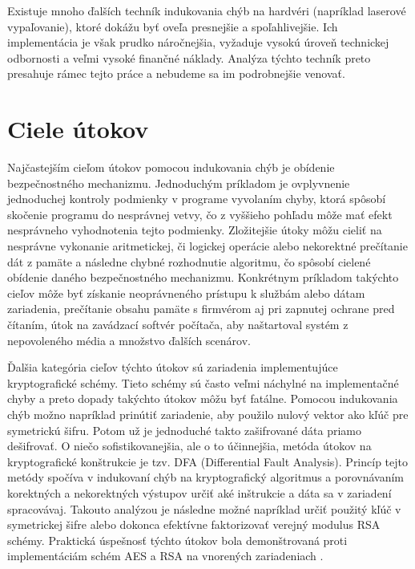 Existuje mnoho ďalších techník indukovania chýb na hardvéri (napríklad laserové vypaľovanie), ktoré dokážu byť oveľa presnejšie a spoľahlivejšie. Ich implementácia je však prudko náročnejšia, vyžaduje vysokú úroveň technickej odbornosti a veľmi vysoké finančné náklady. Analýza týchto techník preto presahuje rámec tejto práce a nebudeme sa im podrobnejšie venovať.

\section{Ciele útokov}
Najčastejším cieľom útokov pomocou indukovania chýb je obídenie bezpečnostného mechanizmu. Jednoduchým príkladom je ovplyvnenie jednoduchej kontroly podmienky v programe vyvolaním chyby, ktorá spôsobí skočenie programu do nesprávnej vetvy, čo z vyššieho pohľadu môže mať efekt nesprávneho vyhodnotenia tejto podmienky. Zložitejšie útoky môžu cieliť na nesprávne vykonanie aritmetickej, či logickej operácie alebo nekorektné prečítanie dát z pamäte a následne chybné rozhodnutie algoritmu, čo spôsobí cielené obídenie daného bezpečnostného mechanizmu. Konkrétnym príkladom takýchto cieľov môže byť získanie neoprávneného prístupu k službám alebo dátam zariadenia, prečítanie obsahu pamäte s firmvérom aj pri zapnutej ochrane pred čítaním, útok na zavádzací softvér počítača, aby naštartoval systém z nepovoleného média a množstvo ďalších scenárov.

Ďalšia kategória cieľov týchto útokov sú zariadenia implementujúce kryptografické schémy. Tieto schémy sú často veľmi náchylné na implementačné chyby a preto dopady takýchto útokov môžu byť fatálne. Pomocou indukovania chýb možno napríklad prinútiť zariadenie, aby použilo nulový vektor ako kľúč pre symetrickú šifru. Potom už je jednoduché takto zašifrované dáta priamo dešifrovať. O niečo sofistikovanejšia, ale o to účinnejšia, metóda útokov na kryptografické konštrukcie je tzv. DFA (Differential Fault Analysis). Princíp tejto metódy spočíva v indukovaní chýb na kryptografický algoritmus a porovnávaním korektných a nekorektných výstupov určiť aké inštrukcie a dáta sa v zariadení spracovávaj. Takouto analýzou je následne možné napríklad určiť použitý kľúč v symetrickej šifre alebo dokonca efektívne faktorizovať verejný modulus RSA schémy. Praktická úspešnosť týchto útokov bola demonštrovaná proti implementáciám schém AES a RSA na vnorených zariadeniach \cite{crypto}.

